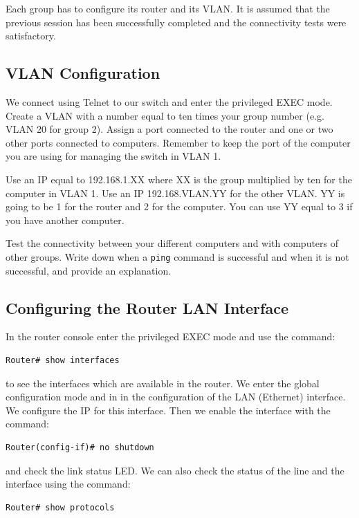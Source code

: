 Each group has to configure its router and its VLAN. It is assumed that the previous session has been successfully completed and the connectivity tests were satisfactory.

\subsection{VLAN Configuration}

We connect using Telnet to our switch and enter the privileged EXEC mode. Create a VLAN with a number equal to ten times your group number (e.g. VLAN 20 for group 2). Assign a port connected to the router and one or two other ports connected to computers. Remember to keep the port of the computer you are using for managing the switch in VLAN 1.

Use an IP equal to 192.168.1.XX where XX is the group multiplied by ten for the computer in VLAN 1. Use an IP 192.168.VLAN.YY for the other VLAN. YY is going to be 1 for the router and 2 for the computer. You can use YY equal to 3 if you have another computer.

Test the connectivity between your different computers and with computers of other groups. Write down when a \texttt{\color{blue}ping} command is successful and when it is not successful, and provide an explanation.

\subsection{Configuring the Router LAN Interface}

In the router console enter the privileged EXEC mode and use the command:

\begin{lstlisting}
Router# show interfaces
\end{lstlisting}

to see the interfaces which are available in the router. We enter the global configuration mode and in in the configuration of the LAN (Ethernet) interface. We configure the IP for this interface. Then we enable the interface with the command:

\begin{lstlisting}
Router(config-if)# no shutdown
\end{lstlisting}

and check the link status LED. We can also check the status of the line and the interface using the command:

\begin{lstlisting}
Router# show protocols
\end{lstlisting}

